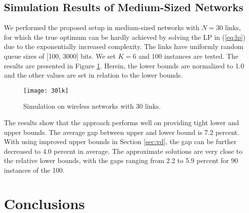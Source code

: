 \documentclass[10pt,onecolumn,journal,draftcls,oneside]{IEEEtran}
\begin{document}
\subsection{Simulation Results of Medium-Sized Networks}

We performed the proposed setup in medium-sized networks with $N = 30$ links, for which the true optimum can be hardly achieved by solving the LP in (\ref{eq:lp}) due to the exponentially increased complexity. The links have uniformly random queue sizes of [100, 3000] bits. We set $K=6$ and 100 instances are tested. The results are presented in Figure \ref{fig:30lk}. Herein, the lower bounds are normalized to 1.0 and the other values are set in relation to the lower bounds.

\begin{figure} [ht!]	
    \centering
{\texttt{[image: 30lk]}}
\vspace{-5mm}
\caption{Simulation on wireless networks with 30 links.}
\label{fig:30lk}
\end{figure}


The results show that the approach performs well on providing tight lower and upper bounds. The average gap between upper and lower bound is 7.2 percent. With using improved upper bounds in Section \ref{sec:vd}, the gap can be further decreased to 4.0 percent in average. The approximate solutions are very close to the relative lower bounds, with the gaps ranging from 2.2 to 5.9 percent for 90 instances of the 100.

\section{Conclusions}
\label{sec:conclusion}
\end{document}
